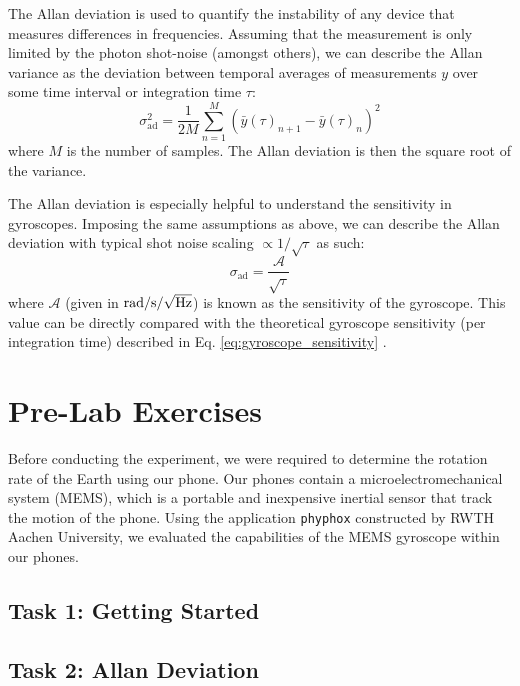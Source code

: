 \documentclass[a4paper]{report}
\numberwithin{equation}{section}
\begin{document}
The Allan deviation is used to quantify the instability of any device that measures differences in frequencies. Assuming that the
measurement is only limited by the photon shot-noise (amongst others), we can describe the Allan variance as the deviation
between temporal averages of measurements $y$ over some time interval or integration time $\tau$:
\begin{equation}
	\sigma_{{\text{ad}}}^2 = \frac{1}{2M} \sum\limits_{n=1}^M (\bar{y}(\tau)_{n+1} - \bar{y}(\tau)_n)^2
\end{equation}
where $M$ is the number of samples. The Allan deviation is then the square root of the variance. \par 

The Allan deviation is especially helpful to understand the sensitivity in gyroscopes. Imposing the same assumptions as above,
we can describe the Allan deviation with typical shot noise scaling $\propto 1 / \sqrt{\tau}$ as such:
\begin{equation}
	\sigma_{\text{ad}} = \frac{\mathcal{A}}{\sqrt{\tau}}
\end{equation}
where $\mathcal{A}$ (given in $\si{\radian\per\second\per\sqrt{\hertz}}$) is known as the sensitivity of the gyroscope. This 
value can be directly compared with the theoretical gyroscope sensitivity (per integration time)
described in Eq. \ref{eq:gyroscope_sensitivity} \cite{Groh2021}.



\chapter{Pre-Lab Exercises}

Before conducting the experiment, we were required to determine the rotation rate of the Earth using our phone. Our phones
contain a microelectromechanical system (MEMS), which is a portable and inexpensive inertial sensor that track the motion of
the phone. Using the application \texttt{phyphox} constructed by RWTH Aachen University, we evaluated the capabilities
of the MEMS gyroscope within our phones. 

\section{Task 1: Getting Started}



\section{Task 2: Allan Deviation} \label{sec:prelab_allan_dev}
\end{document}

